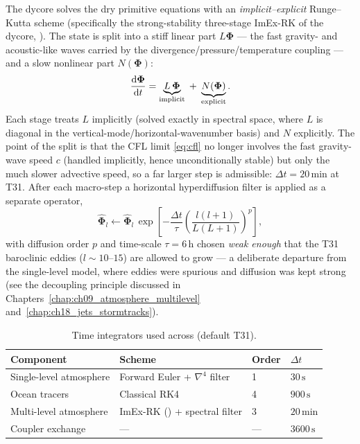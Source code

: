 The \dino{} dycore solves the dry primitive equations with an \emph{implicit--explicit}
Runge--Kutta scheme (specifically the strong-stability three-stage ImEx-RK of the dycore,
). The state is split into a stiff linear part $L\boldsymbol\Phi$ --- the
fast gravity- and acoustic-like waves carried by the divergence/pressure/temperature coupling ---
and a slow nonlinear part $N(\boldsymbol\Phi)$:
\begin{equation}
  \frac{\mathrm{d}\boldsymbol\Phi}{\mathrm{d}t} = \underbrace{L\,\boldsymbol\Phi}_{\text{implicit}}
  \;+\; \underbrace{N(\boldsymbol\Phi)}_{\text{explicit}} .
  \label{eq:imex-split}
\end{equation}
Each stage treats $L$ implicitly (solved exactly in spectral space, where $L$ is diagonal in the
vertical-mode/horizontal-wavenumber basis) and $N$ explicitly. The point of the split is that the
CFL limit \eqref{eq:cfl} no longer involves the fast gravity-wave speed $c$ (handled implicitly,
hence unconditionally stable) but only the much slower advective speed, so a far larger step is
admissible: $\Delta t = 20\,\mathrm{min}$ at T31. After each macro-step a horizontal hyperdiffusion
filter is applied as a separate operator,
\begin{equation}
  \widehat{\boldsymbol\Phi}_l \leftarrow \widehat{\boldsymbol\Phi}_l \,
  \exp\!\left[-\frac{\Delta t}{\tau}\left(\frac{l(l+1)}{L(L+1)}\right)^{\!p}\right],
  \label{eq:dino-diffusion}
\end{equation}
with diffusion order $p$ and time-scale $\tau=6\,\mathrm{h}$ chosen \emph{weak enough} that the
T31 baroclinic eddies ($l\sim10$--$15$) are allowed to grow --- a deliberate departure from the
single-level model, where eddies were spurious and diffusion was kept strong (see the
decoupling principle discussed in Chapters~\ref{chap:ch09_atmosphere_multilevel}
and~\ref{chap:ch18_jets_stormtracks}).


\begin{table}[ht]
\centering
\caption{Time integrators used across \model{} (default T31).}
\label{tab:integrators}
\begin{tabular}{@{}llll@{}}
\toprule
Component & Scheme & Order & $\Delta t$ \\
\midrule
Single-level atmosphere & Forward Euler + $\nabla^4$ filter & 1 & $30\,\mathrm{s}$ \\
Ocean tracers           & Classical RK4                     & 4 & $900\,\mathrm{s}$ \\
Multi-level atmosphere  & ImEx-RK (\dino{}) + spectral filter & 3 & $20\,\mathrm{min}$ \\
Coupler exchange        & ---                               & --- & $3600\,\mathrm{s}$ \\
\bottomrule
\end{tabular}
\end{table}

